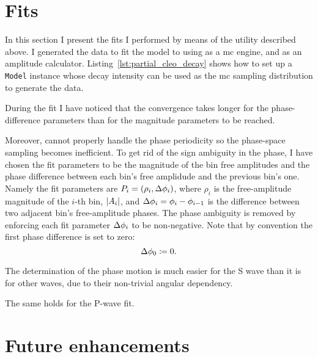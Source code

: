     
    
    

    \section{Fits}

    In this section I present the fits I performed by means of the utility described above.
    I generated the data to fit the model to using  as a \ac{mc} engine, and  as an amplitude calculator.
    Listing~\ref{lst:partial_cleo_decay} shows how to set up a \lstinline!Model! instance whose decay intensity can be used as the \ac{mc} sampling distribution to generate the data.


    During the fit I have noticed that the convergence takes longer for the phase-difference parameters than for the magnitude parameters to be reached.

    {\color{red}
    Moreover,  cannot properly handle the phase periodicity so the phase-space sampling becomes inefficient.
    To get rid of the sign ambiguity in the phase, I have chosen the fit parameters to be the magnitude of the bin free amplitudes and the phase difference between each bin's free amplidude and the previous bin's one.
    Namely the fit parameters are $P_i = (\rho_i, \mathop{}\!\textup{$\Delta$}\phi_i)$, where $\rho_i$ is the free-amplitude magnitude of the $i$-th bin, $\lvert A_i\rvert$, and $\mathop{}\!\textup{$\Delta$}\phi_i = \phi_i - \phi_{i-1}$ is the difference between two adjacent bin's free-amplitude phases. 
    The phase ambiguity is removed by enforcing each fit parameter $\mathop{}\!\textup{$\Delta$}\phi_i$ to be non-negative.
    Note that by convention the first phase difference is set to zero:
    \begin{equation}\label{eq:delta_phi_zero_cond}
        \mathop{}\!\textup{$\Delta$}\phi_0 \coloneqq 0.
    \end{equation}
    }


    
    
    


    The determination of the phase motion is much easier for the S wave than it is for other waves, due to their non-trivial angular dependency.


    The same holds for the P-wave \Prhozero{} fit.


    \section{Future enhancements}
    

